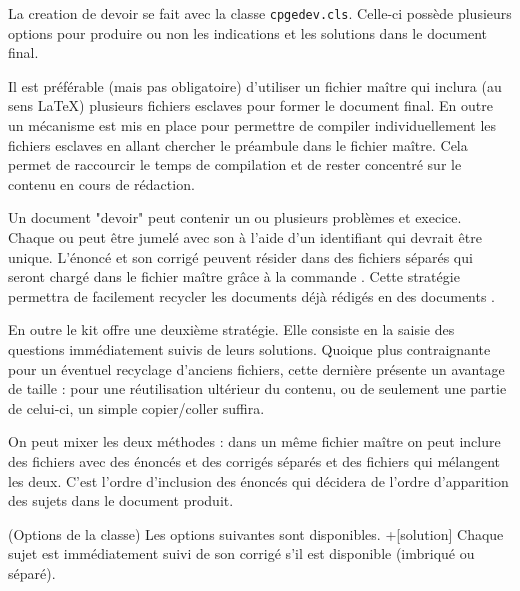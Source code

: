 \documentclass[11pt,report,oneside,solution]{cpgedev}
\let\CMD\cmd
\renewcommand\cmd[1]{{\spotcolor\CMD{#1}}}
\let\ENV\env
\renewcommand\env[1]{{\spotcolor\ENV{#1}}}
\begin{document}
La creation de devoir se fait avec la classe \verb+cpgedev.cls+. Celle-ci possède plusieurs options pour produire ou non les indications et les solutions dans le document final.

Il est préférable (mais pas obligatoire) d'utiliser un fichier maître qui inclura (au sens \LaTeX{}) plusieurs fichiers esclaves pour former le document final. En outre un mécanisme est mis en place pour permettre de compiler individuellement les fichiers esclaves en allant chercher le préambule dans le fichier maître. Cela permet de raccourcir le temps de compilation et de rester concentré sur le contenu en cours de rédaction. 

Un document "devoir" peut contenir un ou plusieurs problèmes et execice. Chaque  ou  peut être jumelé avec son  à l'aide d'un identifiant qui devrait être unique. L'énoncé et son corrigé peuvent résider dans des fichiers séparés qui seront chargé dans le fichier maître grâce à la commande . Cette stratégie permettra de facilement recycler les documents déjà rédigés en des documents . 

En outre le kit offre une deuxième stratégie. Elle consiste en la saisie des questions immédiatement suivis de leurs solutions. Quoique plus contraignante pour un éventuel recyclage d'anciens fichiers, cette dernière présente un avantage de taille : pour une réutilisation ultérieur du contenu, ou de seulement une partie de celui-ci, un simple copier/coller suffira. 

On peut mixer les deux méthodes : dans un même fichier maître on peut inclure des fichiers avec des énoncés et des corrigés séparés et des fichiers qui mélangent les deux. C'est l'ordre d'inclusion des énoncés qui décidera de l'ordre d'apparition des sujets dans le document produit.   



\partie(Options de la classe)
Les options suivantes sont disponibles. 
\xopt+[solution]
     Chaque sujet est immédiatement suivi de son corrigé s'il est disponible (imbriqué ou séparé). 
     
     
\end{document}
